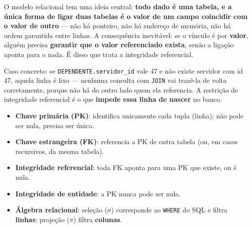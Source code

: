 \begin{conceito}
O modelo relacional tem uma ideia central: \textbf{todo dado é uma
tabela, e a única forma de ligar duas tabelas é o valor de um campo
coincidir com o valor de outro} --- não há ponteiro, não há endereço de
memória, não há ordem garantida entre linhas. A consequência inevitável:
se o vínculo é por \textbf{valor}, alguém precisa \textbf{garantir que o
valor referenciado exista}, senão a ligação aponta para o nada. É disso
que trata a integridade referencial.

Caso concreto: se \texttt{DEPENDENTE.servidor\_id} vale 47 e não existe
servidor com id 47, aquela linha é lixo --- nenhuma consulta com
\texttt{JOIN} vai trazê-la de volta corretamente, porque não há do outro
lado quem ela referencia. A restrição de integridade referencial é o que
\textbf{impede essa linha de nascer} no banco.
\end{conceito}

\begin{conceito}
\begin{itemize}
\item \textbf{Chave primária (PK)}: identifica unicamente cada tupla
(linha); não pode ser nula, precisa ser única.
\item \textbf{Chave estrangeira (FK)}: referencia a PK de outra tabela (ou,
em casos recursivos, da mesma tabela).
\item \textbf{Integridade referencial}: toda FK aponta para uma PK que
existe, ou é nula.
\item \textbf{Integridade de entidade}: a PK nunca pode ser nula.
\item \textbf{Álgebra relacional}: seleção ($\sigma$) corresponde ao
\texttt{WHERE} do SQL e filtra \textbf{linhas}; projeção ($\pi$) filtra
\textbf{colunas}.
\end{itemize}
\end{conceito}

